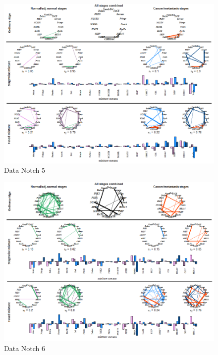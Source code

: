 \documentclass[10pt]{article}
\begin{document}
\begin{figure}
\begin{center}
 \includegraphics[scale=.8]{notch5.png}
\end{center}
\caption{ \small Data Notch 5}
\label{fig:notch5}
\end{figure}






\newpage
\begin{figure}
\begin{center}
 \includegraphics[scale=.8]{notch6.png}
\end{center}
\caption{ Data Notch 6}
\label{fig:notch6}
\end{figure}
\end{document}
